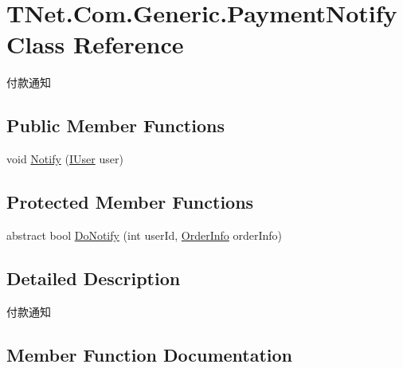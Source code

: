 \hypertarget{class_t_net_1_1_com_1_1_generic_1_1_payment_notify}{}\section{T\+Net.\+Com.\+Generic.\+Payment\+Notify Class Reference}
\label{class_t_net_1_1_com_1_1_generic_1_1_payment_notify}


付款通知  


\subsection*{Public Member Functions}
\begin{DoxyCompactItemize}
\item 
void \mbox{\hyperlink{class_t_net_1_1_com_1_1_generic_1_1_payment_notify_a2ba7548c8b0389f777292a065e00a682}{Notify}} (\mbox{\hyperlink{interface_t_net_1_1_context___1_1_i_user}{I\+User}} user)
\end{DoxyCompactItemize}
\subsection*{Protected Member Functions}
\begin{DoxyCompactItemize}
\item 
abstract bool \mbox{\hyperlink{class_t_net_1_1_com_1_1_generic_1_1_payment_notify_abb0dec159acf285d86dcdad58fa5f7c1}{Do\+Notify}} (int user\+Id, \mbox{\hyperlink{class_t_net_1_1_pay_1_1_order_info}{Order\+Info}} order\+Info)
\end{DoxyCompactItemize}


\subsection{Detailed Description}
付款通知 



\subsection{Member Function Documentation}
\mbox{\label{class_t_net_1_1_com_1_1_generic_1_1_payment_notify_abb0dec159acf285d86dcdad58fa5f7c1}} 
